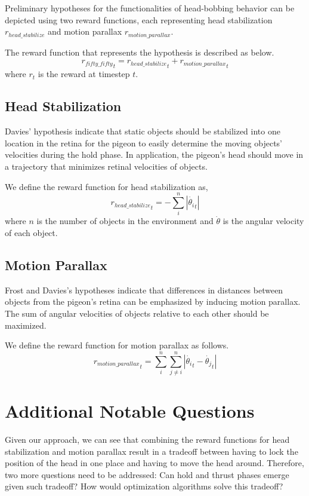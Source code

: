  Preliminary hypotheses for the functionalities of head-bobbing behavior can be depicted using two reward functions, each representing head stabilization ${r_{head\_stabilize}}$ and motion parallax ${r_{motion\_parallax}}$.

  The reward function that represents the hypothesis is described as below.
  \begin{equation}
    {r_{fifty\_fifty}}_t = {r_{head\_stabilize}}_t + {r_{motion\_parallax}}_t
  \end{equation}
  where $r_t$ is the reward at timestep $t$.

  \subsection{Head Stabilization}
    Davies' hypothesis indicate that static objects should be stabilized into one location in the retina for the pigeon to easily determine the moving objects' velocities during the hold phase. In application, the pigeon's head should move in a trajectory that minimizes retinal velocities of objects.

    We define the reward function for head stabilization as,
    \begin{equation}
      {r_{head\_stabilize}}_t = - \sum_i^n |\dot {\theta_i}_t|
    \end{equation}
    where $n$ is the number of objects in the environment and $\dot \theta$ is the angular velocity of each object.

  \subsection{Motion Parallax}
    Frost and Davies's hypotheses indicate that differences in distances between objects from the pigeon's retina can be emphasized by inducing motion parallax.
    The sum of angular velocities of objects relative to each other should be maximized.

    We define the reward function for motion parallax as follows.
    \begin{equation}
      {r_{motion\_parallax}}_t = \sum_i^n \sum_{j \ne i}^n |\dot {\theta_i}_t - \dot {\theta_j}_t|
    \end{equation}


\section{Additional Notable Questions}
  Given our approach, we can see that combining the reward functions for head stabilization and motion parallax result in a tradeoff between having to lock the position of the head in one place and having to move the head around. Therefore, two more questions need to be addressed: Can hold and thrust phases emerge given such tradeoff? How would optimization algorithms solve this tradeoff?

  
